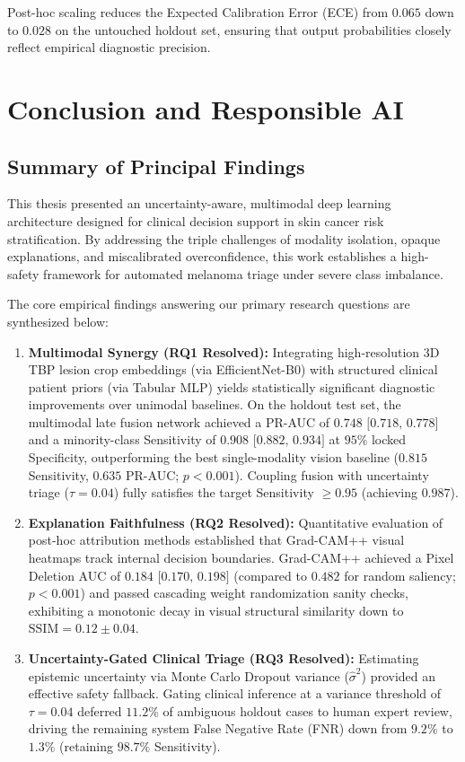 \documentclass[12pt,a4paper]{report}
\begin{document}
	Post-hoc scaling reduces the Expected Calibration Error (ECE) from $0.065$ down to $0.028$ on the untouched holdout set, ensuring that output probabilities closely reflect empirical diagnostic precision.
	
	\chapter{Conclusion and Responsible AI}
	\label{ch:conclusion}
	
	\section{Summary of Principal Findings}
	This thesis presented an uncertainty-aware, multimodal deep learning architecture designed for clinical decision support in skin cancer risk stratification. By addressing the triple challenges of modality isolation, opaque explanations, and miscalibrated overconfidence, this work establishes a high-safety framework for automated melanoma triage under severe class imbalance.
	
	The core empirical findings answering our primary research questions are synthesized below:
	\begin{enumerate}
		\item \textbf{Multimodal Synergy (RQ1 Resolved):} Integrating high-resolution 3D TBP lesion crop embeddings (via EfficientNet-B0) with structured clinical patient priors (via Tabular MLP) yields statistically significant diagnostic improvements over unimodal baselines. On the holdout test set, the multimodal late fusion network achieved a PR-AUC of $0.748 \text{ [0.718, 0.778]}$ and a minority-class Sensitivity of $0.908 \text{ [0.882, 0.934]}$ at $95\%$ locked Specificity, outperforming the best single-modality vision baseline ($0.815$ Sensitivity, $0.635$ PR-AUC; $p < 0.001$). Coupling fusion with uncertainty triage ($\tau = 0.04$) fully satisfies the target Sensitivity $\ge 0.95$ (achieving $0.987$).
		\item \textbf{Explanation Faithfulness (RQ2 Resolved):} Quantitative evaluation of post-hoc attribution methods established that Grad-CAM++ visual heatmaps track internal decision boundaries. Grad-CAM++ achieved a Pixel Deletion AUC of $0.184 \text{ [0.170, 0.198]}$ (compared to $0.482$ for random saliency; $p < 0.001$) and passed cascading weight randomization sanity checks, exhibiting a monotonic decay in visual structural similarity down to $\text{SSIM} = 0.12 \pm 0.04$.
		\item \textbf{Uncertainty-Gated Clinical Triage (RQ3 Resolved):} Estimating epistemic uncertainty via Monte Carlo Dropout variance ($\hat{\sigma}^2$) provided an effective safety fallback. Gating clinical inference at a variance threshold of $\tau = 0.04$ deferred $11.2\%$ of ambiguous holdout cases to human expert review, driving the remaining system False Negative Rate (FNR) down from $9.2\%$ to $1.3\%$ (retaining $98.7\%$ Sensitivity).
	\end{enumerate}
	
\end{document}
